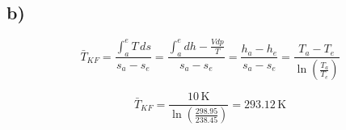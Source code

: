 

\subsection*{b)}

\[
\bar{T}_{KF} = \frac{\int_{a}^{e} T \, ds}{s_a - s_e} = \frac{\int_{a}^{e} dh - \frac{V dp}{T}}{s_a - s_e} = \frac{h_a - h_e}{s_a - s_e} = \frac{T_a - T_e}{\ln \left( \frac{T_a}{T_e} \right)}
\]

\[
\bar{T}_{KF} = \frac{10 \, \text{K}}{\ln \left( \frac{298.95}{238.45} \right)} = 293.12 \, \text{K}
\]
